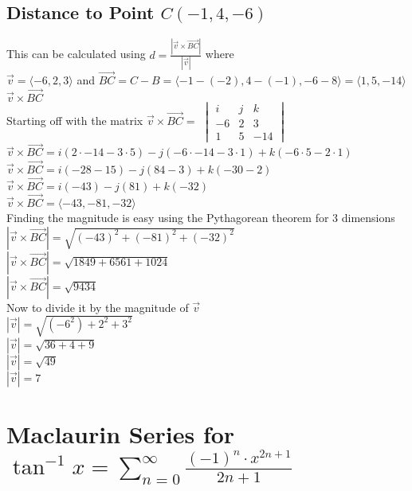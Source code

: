 \documentclass{article}
\begin{document}
\subsection{Distance to Point $C(-1,4,-6)$}
This can be calculated using $d=\frac{|\vec{v}\times\vec{BC}|}{|\vec{v}|} $ where 
\\[0.1in]$\vec{v}= \langle-6, 2, 3\rangle$ and $\vec{BC}=C-B =\langle-1-(-2), 4-(-1), -6-8\rangle = \langle1, 5, -14\rangle$
\textbf{$\vec{v}\times\vec{BC}$}
\\[0.1in]Starting off with the matrix
$\vec{v} \times \vec{BC} = $
$\begin{vmatrix}
i & j & k \\
-6 & 2 & 3 \\
1 & 5 & -14
\end{vmatrix}$
\\[0.05in]$\vec{v}\times\vec{BC} = i(2\cdot-14-3\cdot5)-j(-6\cdot-14-3\cdot 1)+k(-6\cdot5-2\cdot1)$
\\[0.05in]$\vec{v}\times\vec{BC} = i(-28-15)-j(84-3)+k(-30-2)$
\\[0.05in]$\vec{v}\times\vec{BC} = i(-43)-j(81)+k(-32)$
\\[0.05in]$\vec{v}\times\vec{BC} = \langle-43,-81,-32\rangle$
\\Finding the magnitude is easy using the Pythagorean theorem for 3 dimensions
\\$|\vec{v}\times\vec{BC}|=\sqrt{(-43)^2+(-81)^2+(-32)^2}$
\\$|\vec{v}\times\vec{BC}|=\sqrt{1849+6561+1024}$
\\$|\vec{v}\times\vec{BC}|=\boxed{\sqrt{9434}}$
\\[0.05in]Now to divide it by the magnitude of $\vec{v}$
\\[0.05in]$|\vec{v}| = \sqrt{(-6^2)+2^2+3^2}$
\\$|\vec{v}| = \sqrt{36+4+9}$
\\$|\vec{v}| = \sqrt{49}$
\\$|\vec{v}| = 7$
\\


\pagebreak
\section{Maclaurin Series for $\tan^{-1}x=\sum_{n=0}^{\infty}\frac{(-1)^n\cdot x^{2n+1}}{2n+1}$}
\end{document}
